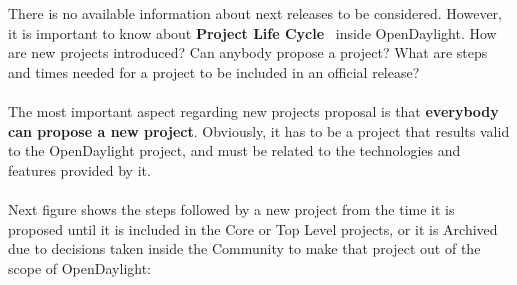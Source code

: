 \documentclass[a4paper, 12pt]{book}
\begin{document}
There is no available information about next releases to be considered. However, it is important to know about \textbf{Project Life Cycle}~\cite{OpenDaylightLifecycle} inside OpenDaylight. How are new projects introduced? Can anybody propose a project? What are steps and times needed for a project to be included in an official release?\\
\\
The most important aspect regarding new projects proposal is that \textbf{everybody can propose a new project}. Obviously, it has to be a project that results valid to the OpenDaylight project, and must be related to the technologies and features provided by it.\\
\\
Next figure shows the steps followed by a new project from the time it is proposed until it is included in the Core or Top Level projects, or it is Archived due to decisions taken inside the Community to make that project out of the scope of OpenDaylight:
\end{document}
